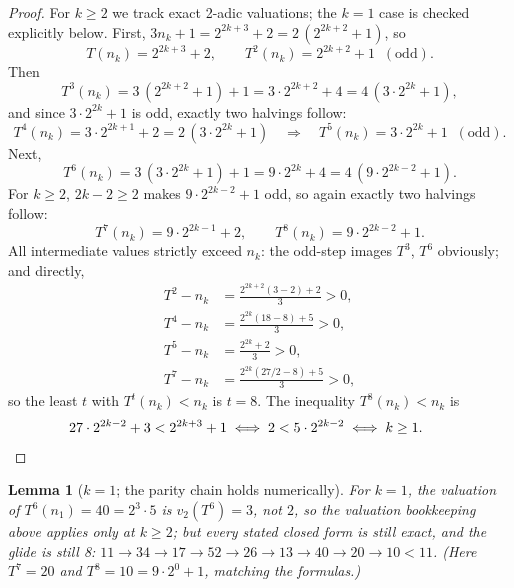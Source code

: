 \documentclass[11pt]{article}
\newtheorem{lemma}[theorem]{Lemma}
\theoremstyle{remark}
\newcommand{\T}{T}
\newcommand{\vtwo}{v_2}
\begin{document}
\begin{proof}
For $k \ge 2$ we track exact 2-adic valuations; the $k = 1$ case is checked
explicitly below. First, $3n_k + 1 = 2^{2k+3} + 2 = 2\,(2^{2k+2}+1)$, so
\[
  \T(n_k) = 2^{2k+3}+2, \qquad \T^2(n_k) = 2^{2k+2}+1 \;\;(\text{odd}).
\]
Then
\[
  \T^3(n_k) = 3\,(2^{2k+2}+1) + 1 = 3\cdot 2^{2k+2} + 4
           = 4\,(3\cdot 2^{2k} + 1),
\]
and since $3\cdot 2^{2k} + 1$ is odd, exactly two halvings follow:
\[
  \T^4(n_k) = 3\cdot 2^{2k+1} + 2 = 2\,(3\cdot 2^{2k}+1)
           \quad\Longrightarrow\quad
  \T^5(n_k) = 3\cdot 2^{2k} + 1 \;\;(\text{odd}).
\]
Next,
\[
  \T^6(n_k) = 3\,(3\cdot 2^{2k}+1) + 1 = 9\cdot 2^{2k} + 4
           = 4\,(9\cdot 2^{2k-2} + 1).
\]
For $k \ge 2$, $2k-2 \ge 2$ makes $9\cdot 2^{2k-2} + 1$ odd, so again
exactly two halvings follow:
\[
  \T^7(n_k) = 9\cdot 2^{2k-1} + 2, \qquad
  \T^8(n_k) = 9\cdot 2^{2k-2} + 1.
\]
All intermediate values strictly exceed $n_k$: the odd-step images $\T^3$,
$\T^6$ obviously; and directly,
\begin{align*}
  \T^2 - n_k &= \tfrac{2^{2k+2}(3-2)+2}{3} > 0,\\
  \T^4 - n_k &= \tfrac{2^{2k}(18-8)+5}{3} > 0,\\
  \T^5 - n_k &= \tfrac{2^{2k}+2}{3} > 0,\\
  \T^7 - n_k &= \tfrac{2^{2k}(27/2 - 8)+5}{3} > 0,
\end{align*}
so the least $t$ with $\T^t(n_k) < n_k$ is $t = 8$. The inequality
$\T^8(n_k) < n_k$ is
\[
  27\cdot 2^{2k-2} + 3 < 2^{2k+3} + 1
  \;\Longleftrightarrow\;
  2 < 5\cdot 2^{2k-2}
  \;\Longleftrightarrow\;
  k \ge 1. \qquad\qedhere
\]
\end{proof}

\begin{lemma}[$k = 1$; the parity chain holds numerically]
For $k = 1$, the valuation of $\T^6(n_1) = 40 = 2^3 \cdot 5$ is
$\vtwo(\T^6) = 3$, not $2$, so the valuation bookkeeping above applies only
at $k \ge 2$; but every stated closed form is still exact, and the glide is
still 8: $11 \to 34 \to 17 \to 52 \to 26 \to 13 \to 40 \to 20 \to
10 < 11$. (Here $\T^7 = 20$ and $\T^8 = 10 = 9\cdot 2^{0} + 1$, matching
the formulas.)
\end{lemma}
\end{document}
